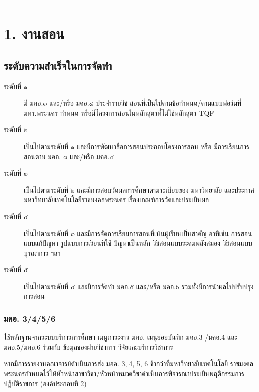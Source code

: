 \documentclass[a4paper,12pt,english]{sphinxmanual}
\begin{document}
\bigskip\hrule\bigskip



\section{1. งานสอน}
\label{\detokenize{submission_part1:id2}}

\subsection{ระดับความสำเร็จในการจัดทำ}
\label{\detokenize{submission_part1:id3}}\begin{description}
\item[{ระดับที่ ๑}] \leavevmode
มี มคอ.๓ และ/หรือ มคอ.๔ ประจำรายวิชาสอนที่เป็นไปตามข้อกำหนด/ตามแบบฟอร์มที่ มทร.พระนคร กำหนด หรือมีโครงการสอนในหลักสูตรที่ไม่ใช่หลักสูตร TQF

\item[{ระดับที่ ๒}] \leavevmode
เป็นไปตามระดับที่ ๑ และมีการพัฒนาสื่อการสอนประกอบโครงการสอน หรือ มีการเรียนการสอนตาม มคอ. ๓ และ/หรือ มคอ.๔

\item[{ระดับที่ ๓}] \leavevmode
เป็นไปตามระดับที่ ๒ และมีการสอบวัดผลการศึกษาตามระเบียบของ มหาวิทยาลัย และประกาศมหาวิทยาลัยเทคโนโลยีราชมงคลพระนคร เรื่องเกณฑ์การวัดและประเมินผล

\item[{ระดับที่ ๔}] \leavevmode
เป็นไปตามระดับที่ ๓  และมีการจัดการเรียนการสอนที่เน้นผู้เรียนเป็นสำคัญ อาทิเช่น การสอนแบบแก้ปัญหา รูปแบบการเรียนที่ใช้
ปัญหาเป็นหลัก วิธีสอนแบบระดมพลังสมอง วิธีสอนแบบบูรณาการ ฯลฯ

\item[{ระดับที่ ๕}] \leavevmode
เป็นไปตามระดับที่ ๔ และมีการจัดทำ มคอ.๕ และ/หรือ มคอ.๖ รวมทั้งมีการนำผลไปปรับปรุงการสอน

\end{description}


\subsubsection{มคอ. 3/4/5/6}
\label{\detokenize{submission_part1:id4}}
ใช้หลักฐานจากระบบบริการการศึกษา เมนูภาระงาน มคอ. เมนูย่อยบันทึก มคอ.3 /มคอ.4  และ มคอ.5/มคอ.6 ร่วมกับ ข้อมูลของฝ่ายวิชาการ วิจัยและบริการวิชาการ

หากมีการรายงานคณาจารย์ดำเนินการส่ง มอค. 3, 4, 5, 6 ช้ากว่าที่มหาวิทยาลัยเทคโนโลยี
ราชมงคลพระนครกำหนดไว้ให้หัวหน้าสาขาวิชา/หัวหน้าหมวดวิชาดำเนินการพิจารณาประเมินพฤติกรรมการปฏิบัติราชการ (องค์ประกอบที่ 2)
\end{document}
